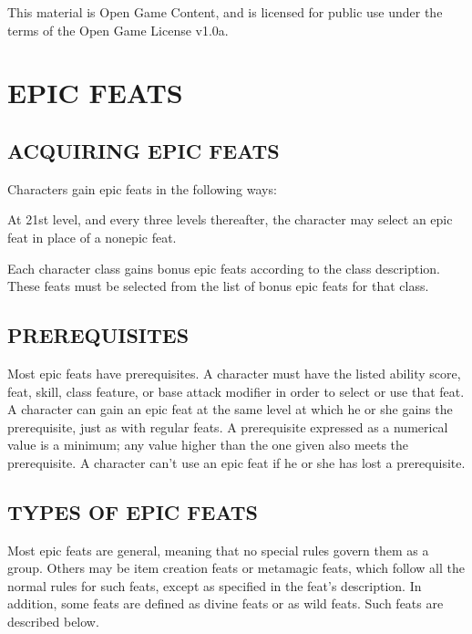 \documentclass{article}
\begin{document}
This material is Open Game Content, and is licensed for public use under the terms 
of the Open Game License v1.0a.

\section*{{\LARGE{}EPIC FEATS }}

\vspace{12pt}
\subsection*{{\LARGE{}ACQUIRING EPIC FEATS}}

Characters gain epic feats in the following ways: 

At 21st level, and every three levels thereafter, the character may select an epic 
feat in place of a nonepic feat.

Each character class gains bonus epic feats according to the class description. 
These feats must be selected from the list of bonus epic feats for that class. 

\vspace{12pt}
\subsection*{{\LARGE{}PREREQUISITES}}

Most epic feats have prerequisites. A character must have the listed ability score, 
feat, skill, class feature, or base attack modifier in order to select or use that 
feat. A character can gain an epic feat at the same level at which he or she gains 
the prerequisite, just as with regular feats. A prerequisite expressed as a numerical 
value is a minimum; any value higher than the one given also meets the prerequisite. 
A character can't use an epic feat if he or she has lost a prerequisite. 

\vspace{12pt}
\subsection*{{\LARGE{}TYPES OF EPIC FEATS }}

Most epic feats are general, meaning that no special rules govern them as a group. 
Others may be item creation feats or metamagic feats, which follow all the normal 
rules for such feats, except as specified in the feat's description. In addition, 
some feats are defined as divine feats or as wild feats. Such feats are described 
below. 
\end{document}
